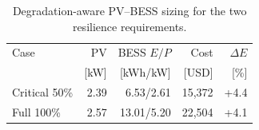 \begin{table}[t]
\centering
\small
\caption{Degradation-aware PV--BESS sizing for the two resilience requirements.}
\label{tab:sizing}
\begin{tabular}{lrrrr}
\toprule
Case & PV & BESS $E/P$ & Cost & $\Delta E$ \\
 & [kW] & [kWh/kW] & [USD] & [\%] \\
\midrule
Critical 50\% & 2.39 & 6.53/2.61 & 15,372 & +4.4 \\
Full 100\% & 2.57 & 13.01/5.20 & 22,504 & +4.1 \\
\bottomrule
\end{tabular}
\par\vspace{1mm}{\footnotesize $\Delta E$ is the BESS-capacity increase relative to sizing without degradation.}
\end{table}
